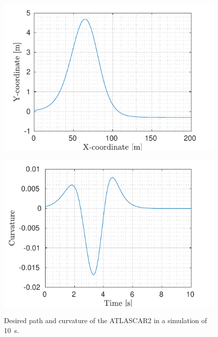 \begin{figure}[!h]
	\centering
	\begin{minipage}[t]{0.49\textwidth}
		\includegraphics[width=\textwidth]{../../MATLAB/lane_following_curve/figure/Reference_curve.pdf}
		\subcaption{}
		\label{fig:reference_laneFollowing_curve}
	\end{minipage}
	\begin{minipage}[t]{0.49\textwidth}
		\includegraphics[width=\textwidth]{../../MATLAB/lane_following_curve/figure/Curvature_curve.pdf}
		\subcaption{}
		\label{fig:curvature_laneFollowing_curve}
	\end{minipage}
	\caption{Desired path and curvature of the ATLASCAR2 in a simulation of \SI{10}{s}.}
	\label{fig:laneFollowing_desired_curve}
\end{figure}
